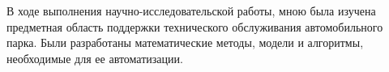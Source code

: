 В ходе выполнения научно-исследовательской работы, мною была изучена предметная
область поддержки технического обслуживания автомобильного парка. Были
разработаны математические методы, модели и алгоритмы, необходимые для ее
автоматизации.
